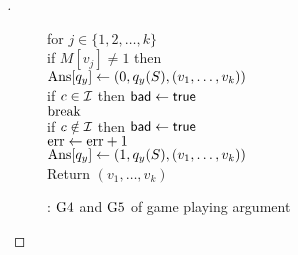 \begin{proof}[]
\begin{figure}
{{for $j \in \{1,2,\ldots,k\}$\\
\nudge if $M[v_j] \neq 1$ then \\
\nudge \nudge $\mathrm{Ans}[q_y] \gets (0, q_y(S), (v_1, \ldots, v_{k}) )$\\
\nudge \nudge if $c \in {\cal I}$ then $\mathsf{bad} \gets \mathsf{true}$\\
\nudge \nudge $\mathrm{break}$\\
if $c \notin {\cal I}$ then $\mathsf{bad} \gets \mathsf{true}$\\
$\mathrm{err} \gets \mathrm{err} +1$\\
$\mathrm{Ans}[q_y] \gets (1, q_y(S), (v_1, \ldots, v_{k}))$\\
Return $\left(v_1,\ldots,v_k\right)$
}
}
\caption{: $\text{G4}$ and $\text{G5}$ of game playing argument}\label{fig:3TGame}
\end{figure}

\end{proof}
